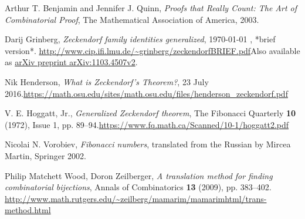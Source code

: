 \documentclass[numbers=enddot,12pt,final,onecolumn,notitlepage]{scrartcl}%
\numberwithin{exer}{section}
\theoremstyle{definition}
\begin{document}
\begin{thebibliography}{99999999}                                                                                         %


Arthur T. Benjamin and Jennifer J. Quinn,
\textit{Proofs that Really Count: The Art of Combinatorial Proof}, The
Mathematical Association of America, 2003.

Darij Grinberg, \textit{Zeckendorf family
identities generalized},
\today
, *brief version*.\newline%
\url{http://www.cip.ifi.lmu.de/~grinberg/zeckendorfBRIEF.pdf}\newline Also
available as \href{https://arxiv.org/abs/1103.4507v2}{arXiv preprint
arXiv:1103.4507v2}.

Nik Henderson, \textit{What is Zeckendorf's
Theorem?}, 23 July 2016.\newline\url{https://math.osu.edu/sites/math.osu.edu/files/henderson_zeckendorf.pdf}

V. E. Hoggatt, Jr., \textit{Generalized Zeckendorf
theorem}, The Fibonacci Quarterly \textbf{10} (1972), Issue 1, pp.
89--94.\newline\url{https://www.fq.math.ca/Scanned/10-1/hoggatt2.pdf}

Nicolai N. Vorobiev, \textit{Fibonacci numbers},
translated from the Russian by Mircea Martin, Springer 2002.

Philip Matchett Wood, Doron Zeilberger, \textit{A
translation method for finding combinatorial bijections}, Annals of
Combinatorics \textbf{13} (2009), pp. 383--402. \newline\url{http://www.math.rutgers.edu/~zeilberg/mamarim/mamarimhtml/trans-method.html}
\end{thebibliography}
\end{document}
